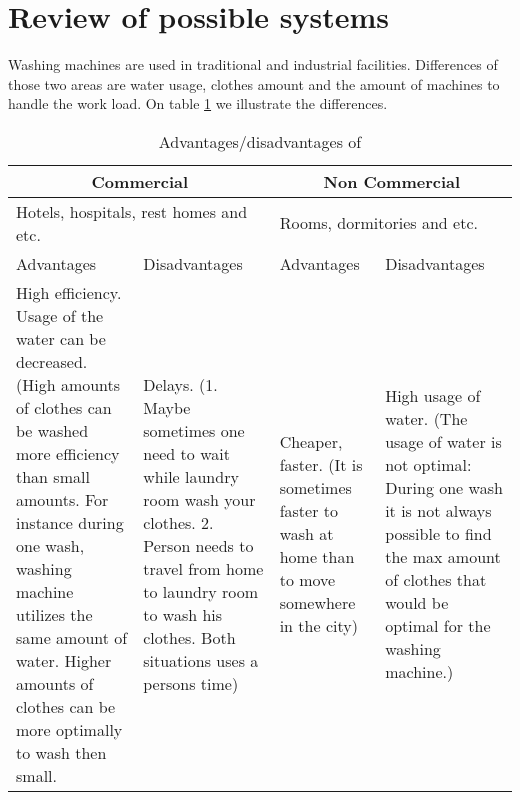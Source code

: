 \section{Review of possible systems}
Washing machines are used in traditional and industrial facilities. Differences of those two areas are water usage, clothes amount and the amount of machines to handle the work load. On table \ref{tab:AdDis} we illustrate the differences.

\begin{table}[h]
	\centering
    \begin{tabular}{ | p{3.5cm} | p{3.5cm} | p{3.5cm} | p{3.5cm} |}
    \hline
    \multicolumn{2}{|c|}{\textbf{Commercial}} & \multicolumn{2}{|c|}{\textbf{Non Commercial}} \\ \hline
    \multicolumn{2}{|l|}{Hotels, hospitals, rest homes and etc.} & \multicolumn{2}{|l|}{Rooms, dormitories and etc.} \\ \hline
    Advantages & Disadvantages & Advantages & Disadvantages \\ \hline
    High efficiency. Usage of the water can be decreased. (High amounts of clothes can be washed more efficiency than small amounts. For instance during one wash, washing machine utilizes the same amount of water. Higher amounts of clothes can be more optimally to wash then small. & Delays. (1. Maybe sometimes one need to wait while laundry room wash your clothes. 2. Person needs to travel from home to laundry room to wash his clothes. Both situations uses a persons time) & Cheaper, faster. (It is sometimes faster to wash at home than to move somewhere in the city) & High usage of water. (The usage of water is not optimal: During one wash it is not always possible to find the max amount of clothes that would be optimal for the washing machine.) \\ \hline
    \end{tabular}
	\caption{Advantages/disadvantages of }
	\label{tab:AdDis}
\end{table}